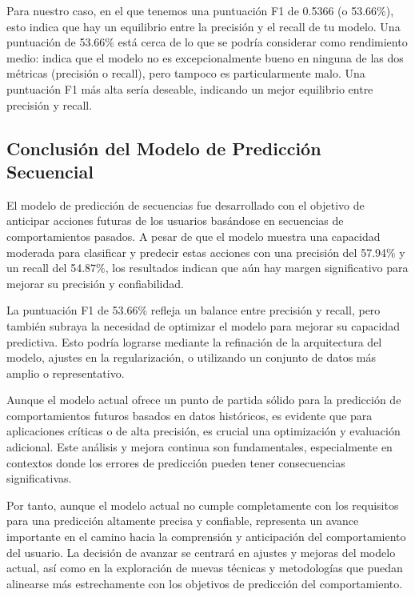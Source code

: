 Para nuestro caso, en el que tenemos una puntuación F1 de 0.5366 (o 53.66\%), esto indica que hay un equilibrio entre la precisión y el recall de tu modelo. Una puntuación de 53.66\% está cerca de lo que se podría considerar como rendimiento medio: indica que el modelo no es excepcionalmente bueno en ninguna de las dos métricas (precisión o recall), pero tampoco es particularmente malo. Una puntuación F1 más alta sería deseable, indicando un mejor equilibrio entre precisión y recall.

\subsection{Conclusión del Modelo de Predicción Secuencial}
El modelo de predicción de secuencias fue desarrollado con el objetivo de anticipar acciones futuras de los usuarios basándose en secuencias de comportamientos pasados. A pesar de que el modelo muestra una capacidad moderada para clasificar y predecir estas acciones con una precisión del 57.94\% y un recall del 54.87\%, los resultados indican que aún hay margen significativo para mejorar su precisión y confiabilidad.

La puntuación F1 de 53.66\% refleja un balance entre precisión y recall, pero también subraya la necesidad de optimizar el modelo para mejorar su capacidad predictiva. Esto podría lograrse mediante la refinación de la arquitectura del modelo, ajustes en la regularización, o utilizando un conjunto de datos más amplio o representativo.

Aunque el modelo actual ofrece un punto de partida sólido para la predicción de comportamientos futuros basados en datos históricos, es evidente que para aplicaciones críticas o de alta precisión, es crucial una optimización y evaluación adicional. Este análisis y mejora continua son fundamentales, especialmente en contextos donde los errores de predicción pueden tener consecuencias significativas.

Por tanto, aunque el modelo actual no cumple completamente con los requisitos para una predicción altamente precisa y confiable, representa un avance importante en el camino hacia la comprensión y anticipación del comportamiento del usuario. La decisión de avanzar se centrará en ajustes y mejoras del modelo actual, así como en la exploración de nuevas técnicas y metodologías que puedan alinearse más estrechamente con los objetivos de predicción del comportamiento.